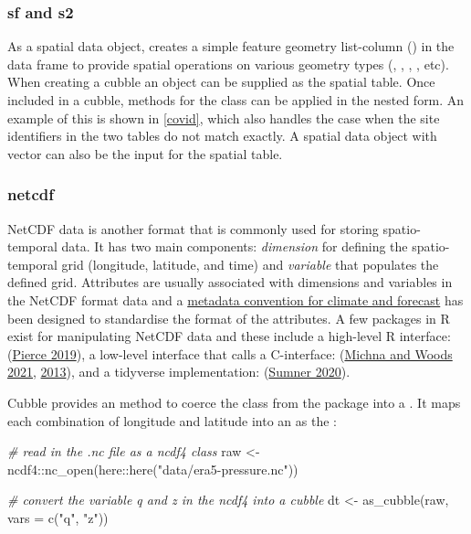 \documentclass{article}
\newenvironment{Shaded}{\begin{snugshade}}{\end{snugshade}}
\newcommand{\AttributeTok}[1]{\textcolor[rgb]{0.77,0.63,0.00}{#1}}
\newcommand{\CommentTok}[1]{\textcolor[rgb]{0.56,0.35,0.01}{\textit{#1}}}
\newcommand{\FunctionTok}[1]{\textcolor[rgb]{0.00,0.00,0.00}{#1}}
\newcommand{\NormalTok}[1]{#1}
\newcommand{\OtherTok}[1]{\textcolor[rgb]{0.56,0.35,0.01}{#1}}
\newcommand{\SpecialCharTok}[1]{\textcolor[rgb]{0.00,0.00,0.00}{#1}}
\newcommand{\StringTok}[1]{\textcolor[rgb]{0.31,0.60,0.02}{#1}}
\begin{document}
\hypertarget{sf-and-s2}{%
\subsubsection{sf and s2}\label{sf-and-s2}}

As a spatial data object,  creates a simple feature geometry list-column () in the data frame to provide spatial operations on various geometry types (, , , , etc). When creating a cubble an  object can be supplied as the spatial table. Once included in a cubble, methods for the  class can be applied in the nested form. An example of this is shown in \ref{covid}, which also handles the case when the site identifiers in the two tables do not match exactly. A spatial data object with  vector can also be the input for the spatial table.

\hypertarget{netcdf}{%
\subsubsection{netcdf}\label{netcdf}}

NetCDF data is another format that is commonly used for storing spatio-temporal data. It has two main components: \emph{dimension} for defining the spatio-temporal grid (longitude, latitude, and time) and \emph{variable} that populates the defined grid. Attributes are usually associated with dimensions and variables in the NetCDF format data and a \href{http://cfconventions.org/}{metadata convention for climate and forecast} has been designed to standardise the format of the attributes. A few packages in R exist for manipulating NetCDF data and these include a high-level R interface:  (\protect\hyperlink{ref-ncdf4}{Pierce 2019}), a low-level interface that calls a C-interface:  (\protect\hyperlink{ref-rnetcdf}{Michna and Woods 2021}, \protect\hyperlink{ref-michna2013rnetcdf}{2013}), and a tidyverse implementation:  (\protect\hyperlink{ref-tidync}{Sumner 2020}).

Cubble provides an  method to coerce the  class from the  package into a . It maps each combination of longitude and latitude into an  as the :

\begin{Shaded}
\begin{Highlighting}[]
\CommentTok{\# read in the .nc file as a ncdf4 class}
\NormalTok{raw }\OtherTok{\textless{}{-}}\NormalTok{ ncdf4}\SpecialCharTok{::}\FunctionTok{nc\_open}\NormalTok{(here}\SpecialCharTok{::}\FunctionTok{here}\NormalTok{(}\StringTok{"data/era5{-}pressure.nc"}\NormalTok{))}

\CommentTok{\# convert the variable q and z in the ncdf4 into a cubble}
\NormalTok{dt }\OtherTok{\textless{}{-}} \FunctionTok{as\_cubble}\NormalTok{(raw, }\AttributeTok{vars =} \FunctionTok{c}\NormalTok{(}\StringTok{"q"}\NormalTok{, }\StringTok{"z"}\NormalTok{))}
\end{Highlighting}
\end{Shaded}
\end{document}
